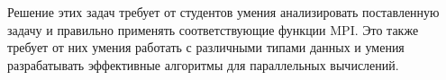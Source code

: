 Решение этих задач требует от студентов умения анализировать поставленную задачу и правильно применять соответствующие функции MPI. Это также требует от них умения работать с различными типами данных и умения разрабатывать эффективные алгоритмы для параллельных вычислений.

















